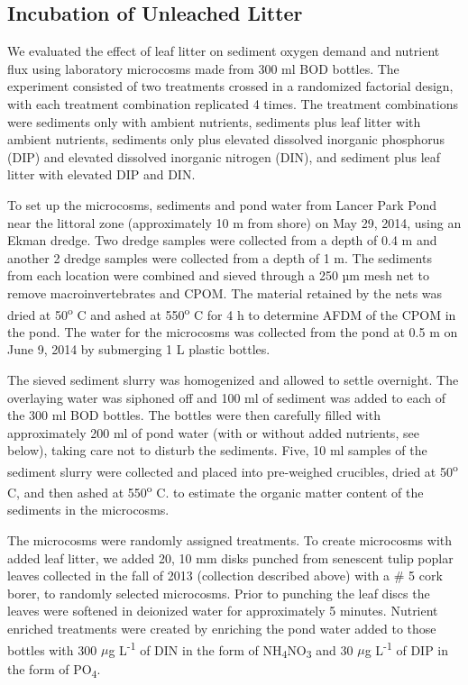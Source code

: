 \subsection{Incubation of Unleached Litter}
We evaluated the effect of leaf litter on sediment oxygen demand and nutrient flux using laboratory microcosms made from 300 ml BOD bottles. The experiment consisted of two treatments crossed in a randomized factorial design, with each treatment combination replicated 4 times. The treatment combinations were sediments only with ambient nutrients, sediments plus leaf litter with ambient nutrients, sediments only plus elevated dissolved inorganic phosphorus (DIP) and elevated dissolved inorganic nitrogen (DIN), and sediment plus leaf litter with elevated DIP and DIN. 

To set up the microcosms, sediments and pond water from Lancer Park Pond near the littoral zone (approximately 10 m from shore) on May 29, 2014, using an Ekman dredge.  Two dredge samples were collected from a depth of 0.4 m and another 2 dredge samples were collected from a depth of 1 m. The sediments from each location were combined and sieved through a 250 µm mesh net to remove macroinvertebrates and CPOM. The material retained by the nets was dried at 50\textsuperscript{o} C and ashed at 550\textsuperscript{o} C for 4 h to determine AFDM of the CPOM in the pond. The water for the microcosms was  collected from the pond at 0.5 m on June 9, 2014 by submerging 1 L plastic bottles.

The sieved sediment slurry was homogenized and allowed to settle overnight. The overlaying water was siphoned off and 100 ml of sediment was added to each of the 300 ml BOD bottles. The bottles were then carefully filled with approximately 200 ml of pond water (with or without added nutrients, see below), taking care not to disturb the sediments. Five, 10 ml samples of the sediment slurry were collected and placed into pre-weighed crucibles, dried at 50\textsuperscript{o} C, and then ashed at 550\textsuperscript{o} C. to estimate the organic matter content of the sediments in the microcosms.

The microcosms were randomly assigned treatments. To create microcosms with added leaf litter, we added 20, 10 mm disks punched from senescent tulip poplar leaves collected in the fall of 2013 (collection described above) with a \# 5 cork borer, to randomly selected microcosms. Prior to punching the leaf discs the leaves were softened in deionized water for approximately 5 minutes. Nutrient enriched treatments were created by enriching the pond water added to those bottles with 300 $\mu$g L\textsuperscript{-1} of DIN in the form of NH\textsubscript{4}NO\textsubscript{3} and 30 $\mu$g L\textsuperscript{-1} of DIP in the form of PO\textsubscript{4}.

